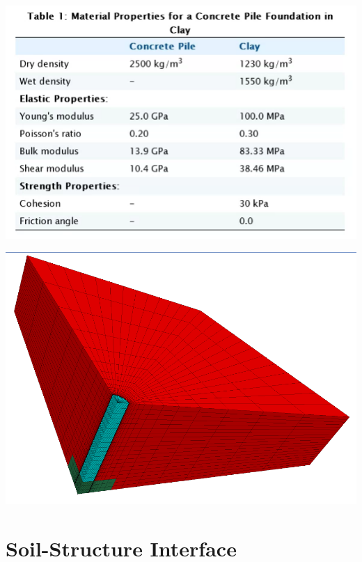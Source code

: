 \documentclass[a4paper, nobind]{templates/ociamthesis}
\begin{document}
\includegraphics[width=1\linewidth]{myfigureeeeee/concrete-properties}

\includegraphics[width=1\linewidth]{myfigureeeeee/d}

\hypertarget{soil-structure-interface}{%
\section{Soil-Structure Interface}\label{soil-structure-interface}}
\end{document}
